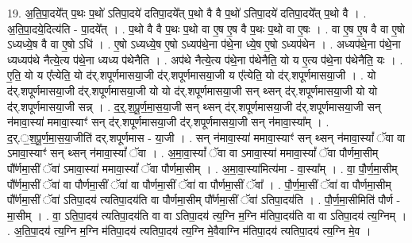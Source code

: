 \documentclass[17pt]{extarticle}
\begin{document}
19. अ॒ति॒पा॒दये᳚त् प॒थः प॒थो॑ ऽतिपा॒दये॑ दतिपा॒दये᳚त् प॒थो वै वै प॒थो॑ ऽतिपा॒दये॑ दतिपा॒दये᳚त् प॒थो वै । . अ॒ति॒पा॒दये॒दित्य॑ति - पा॒दये᳚त् । . प॒थो वै वै प॒थः प॒थो वा ए॒ष ए॒ष वै प॒थः प॒थो वा ए॒षः । . वा ए॒ष ए॒ष वै वा ए॒षो ऽध्यध्ये॒ष वै वा ए॒षो ऽधि॑ । . ए॒षो ऽध्यध्ये॒ष ए॒षो ऽध्यप॑थे॒ना प॑थे॒ना ध्ये॒ष ए॒षो ऽध्यप॑थेन । . अध्यप॑थे॒ना प॑थे॒ना ध्यध्यप॑थे नैत्ये॒त्य प॑थे॒ना ध्यध्य प॑थेनैति । . अप॑थे नैत्ये॒त्य प॑थे॒ना प॑थेनैति॒ यो य ए॒त्य प॑थे॒ना प॑थेनैति॒ यः । . ए॒ति॒ यो य ए᳚त्येति॒ यो द॑र्.शपूर्णमासया॒जी द॑र्.शपूर्णमासया॒जी य ए᳚त्येति॒ यो द॑र्.शपूर्णमासया॒जी । . यो द॑र्.शपूर्णमासया॒जी द॑र्.शपूर्णमासया॒जी यो यो द॑र्.शपूर्णमासया॒जी सन् थ्सन् द॑र्.शपूर्णमासया॒जी यो यो द॑र्.शपूर्णमासया॒जी सन्न् । . द॒र्॒.श॒पू॒र्ण॒मा॒स॒या॒जी सन् थ्सन् द॑र्.शपूर्णमासया॒जी द॑र्.शपूर्णमासया॒जी सन् न॑मावा॒स्या॑ ममावा॒स्याꣳ॑ सन् द॑र्.शपूर्णमासया॒जी द॑र्.शपूर्णमासया॒जी सन् न॑मावा॒स्या᳚म् । . द॒र्.॒श॒पू॒र्ण॒मा॒स॒या॒जीति॑ दर्.शपूर्णमास - या॒जी । . सन् न॑मावा॒स्या॑ ममावा॒स्याꣳ॑ सन् थ्सन् न॑मावा॒स्यां᳚ ॅवा वा ऽमावा॒स्याꣳ॑ सन् थ्सन् न॑मावा॒स्यां᳚ ॅवा । . अ॒मा॒वा॒स्यां᳚ ॅवा वा ऽमावा॒स्या॑ ममावा॒स्यां᳚ ॅवा पौर्णमा॒सीम् पौ᳚र्णमा॒सीं ॅवा॑ ऽमावा॒स्या॑ ममावा॒स्यां᳚ ॅवा पौर्णमा॒सीम् । . अ॒मा॒वा॒स्या॑मित्य॑मा - वा॒स्या᳚म् । . वा॒ पौ॒र्ण॒मा॒सीम् पौ᳚र्णमा॒सीं ॅवा॑ वा पौर्णमा॒सीं ॅवा॑ वा पौर्णमा॒सीं ॅवा॑ वा पौर्णमा॒सीं ॅवा᳚ । . पौ॒र्ण॒मा॒सीं ॅवा॑ वा पौर्णमा॒सीम् पौ᳚र्णमा॒सीं ॅवा॑ ऽतिपा॒दय॑ त्यतिपा॒दय॑ति वा पौर्णमा॒सीम् पौ᳚र्णमा॒सीं ॅवा॑ ऽतिपा॒दय॑ति । . पौ॒र्ण॒मा॒सीमिति॑ पौर्ण - मा॒सीम् । . वा॒ ऽति॒पा॒दय॑ त्यतिपा॒दय॑ति वा वा ऽतिपा॒दय॑ त्य॒ग्नि म॒ग्नि म॑तिपा॒दय॑ति वा वा ऽतिपा॒दय॑ त्य॒ग्निम् । . अ॒ति॒पा॒दय॑ त्य॒ग्नि म॒ग्नि म॑तिपा॒दय॑ त्यतिपा॒दय॑ त्य॒ग्नि मे॒वैवाग्नि म॑तिपा॒दय॑ त्यतिपा॒दय॑ त्य॒ग्नि मे॒व । \newline
\end{document}
